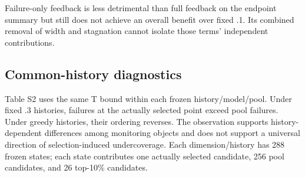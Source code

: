\documentclass[suppldata]{interact}
\begin{document}
Failure-only feedback is less detrimental than full feedback on the endpoint summary but still does not achieve an overall benefit over fixed .1. Its combined removal of width and stagnation cannot isolate those terms' independent contributions.

\hypertarget{common-history-diagnostics}{%
\subsection{Common-history diagnostics}\label{common-history-diagnostics}}

Table S2 uses the same T bound within each frozen history/model/pool. Under fixed .3 histories, failures at the actually selected point exceed pool failures. Under greedy histories, their ordering reverses. The observation supports history-dependent differences among monitoring objects and does not support a universal direction of selection-induced undercoverage. Each dimension/history has 288 frozen states; each state contributes one actually selected candidate, 256 pool candidates, and 26 top-10\% candidates.

\FloatBarrier\begingroup\fontsize{8.5}{10.5}\selectfont\setlength\tabcolsep{3pt}
\end{document}
